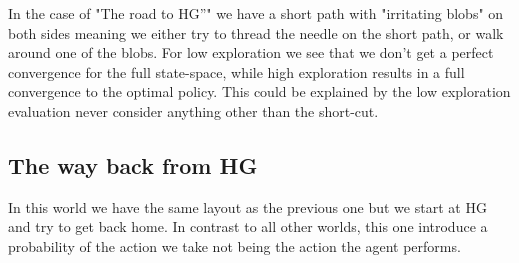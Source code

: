 \documentclass[a4paper,12pt]{article}
\begin{document}
In the case of "The road to HG”" we have a short path with "irritating blobs" on both sides meaning we either try to thread the needle on the short path, or walk around one of the blobs. For low exploration we see that we don't get a perfect convergence for the full state-space, while high exploration results in a full convergence to the optimal policy. This could be explained by the low exploration evaluation never consider anything other than the short-cut.

\subsection{The way back from HG}

In this world we have the same layout as the previous one but we start at HG and try to get back home. In contrast to all other worlds, this one introduce a probability of the action we take not being the action the agent performs. 
\end{document}
